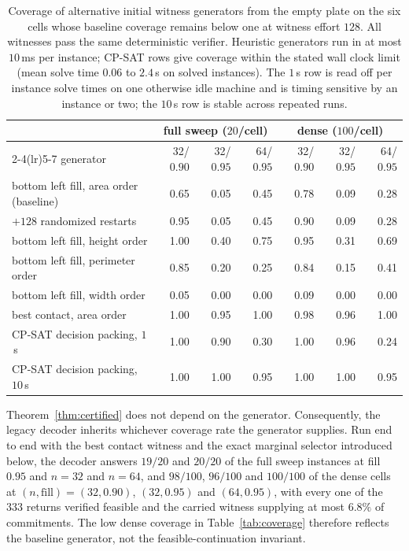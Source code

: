\documentclass[preprint,12pt,authoryear]{elsarticle}
\begin{document}
\begin{table}[t]
\centering
\caption{Coverage of alternative initial witness generators from the empty plate on the
six cells whose baseline coverage remains below one at witness effort $128$.
All witnesses pass the same
deterministic verifier. Heuristic generators run in at most $10$\,ms per
instance; CP-SAT rows give coverage within the stated wall clock limit (mean
solve time $0.06$ to $2.4$\,s on solved instances). The $1$\,s row is read off
per instance solve times on one otherwise idle machine and is
timing sensitive by an instance or two; the $10$\,s row is stable across
repeated runs.}
\label{tab:witfrontier}
\footnotesize
\setlength{\tabcolsep}{2.5pt}
\begin{tabular}{@{}lrrrrrr@{}}
\toprule
 & \multicolumn{3}{c}{full sweep ($20$/cell)} & \multicolumn{3}{c}{dense ($100$/cell)} \\
\cmidrule(lr){2-4}\cmidrule(lr){5-7}
generator & 32/$0.90$ & 32/$0.95$ & 64/$0.95$ & 32/$0.90$ & 32/$0.95$ & 64/$0.95$ \\
\midrule
bottom left fill, area order (baseline) & 0.65 & 0.05 & 0.45 & 0.78 & 0.09 & 0.28 \\
\quad $+128$ randomized restarts        & 0.95 & 0.05 & 0.45 & 0.90 & 0.09 & 0.28 \\
bottom left fill, height order          & 1.00 & 0.40 & 0.75 & 0.95 & 0.31 & 0.69 \\
bottom left fill, perimeter order       & 0.85 & 0.20 & 0.25 & 0.84 & 0.15 & 0.41 \\
bottom left fill, width order           & 0.05 & 0.00 & 0.00 & 0.09 & 0.00 & 0.00 \\
best contact, area order                & 1.00 & 0.95 & 1.00 & 0.98 & 0.96 & 1.00 \\
CP-SAT decision packing, $1$\,s         & 1.00 & 0.90 & 0.30 & 1.00 & 0.96 & 0.24 \\
CP-SAT decision packing, $10$\,s        & 1.00 & 1.00 & 0.95 & 1.00 & 1.00 & 0.95 \\
\bottomrule
\end{tabular}
\end{table}

Theorem~\ref{thm:certified} does not depend on the generator. Consequently, the
legacy decoder inherits whichever coverage rate the generator supplies. Run end to end with the
best contact witness and the exact marginal selector introduced below, the
decoder answers $19/20$ and $20/20$ of the full sweep instances at fill $0.95$ and
$n=32$ and $n=64$, and $98/100$, $96/100$ and $100/100$ of the dense cells at
$(n,\text{fill})=(32,0.90)$, $(32,0.95)$ and $(64,0.95)$,
with every one of the $333$ returns verified feasible and the carried witness
supplying at most
$6.8\%$ of commitments. The low dense coverage in Table~\ref{tab:coverage}
therefore reflects the baseline generator, not the feasible-continuation invariant.
\end{document}
